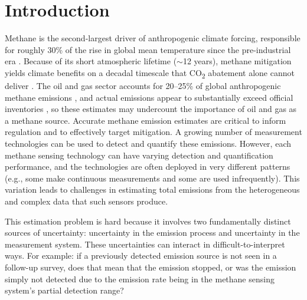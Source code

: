 \documentclass[numsec,webpdf,modern,mediumone]{oup-authoring-template}
\begin{document}

\maketitle

\linenumbers

\section{Introduction}
\label{sec:introduction}


Methane is the second-largest driver of anthropogenic climate forcing, responsible for roughly 30\% of the rise in global mean temperature since the pre-industrial era \citep{IPCC2021}. Because of its short atmospheric lifetime ($\sim$12 years), methane mitigation yields climate benefits on a decadal timescale that CO\textsubscript{2} abatement alone cannot deliver \citep{Ocko2021}. The oil and gas sector accounts for 20--25\% of global anthropogenic methane emissions \citep{Saunois2020, Saunois2025}, and actual emissions appear to substantially exceed official inventories \citep{Alvarez2018, Brandt2014, Sherwin2024Nature}, so these estimates may undercount the importance of oil and gas as a methane source. Accurate methane emission estimates are critical to inform regulation and to effectively target mitigation. A growing number of measurement technologies can be used to detect and quantify these emissions. However, each methane sensing technology can have varying detection and quantification performance, and the technologies are often deployed in very different patterns (e.g., some make continuous measurements and some are used infrequently). This variation leads to challenges in estimating total emissions from the heterogeneous and complex data that such sensors produce.



This estimation problem is hard because it involves two fundamentally distinct sources of uncertainty: uncertainty in the emission process and uncertainty in the measurement system. These uncertainties can interact in difficult-to-interpret ways. For example: if a previously detected emission source is not seen in a follow-up survey, does that mean that the emission stopped, or was the emission simply not detected due to the emission rate being in the methane sensing system's partial detection range?
\end{document}
